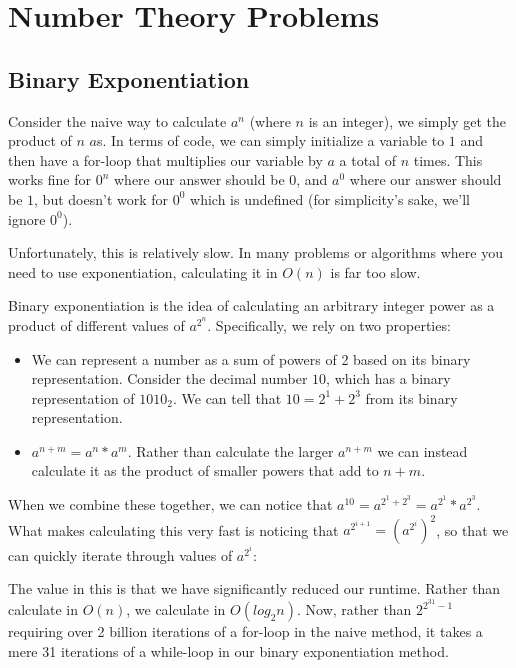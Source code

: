 \section{Number Theory Problems}

\subsection{Binary Exponentiation}

Consider the naive way to calculate $a^n$ (where $n$ is an integer), we simply get the product of $n$ $a$s. In terms of code, we can simply initialize a variable to $1$ and then have a for-loop that multiplies our variable by $a$ a total of $n$ times. This works fine for $0^n$ where our answer should be 0, and $a^0$ where our answer should be $1$, but doesn't work for $0^0$ which is undefined (for simplicity's sake, we'll ignore $0^0$).


Unfortunately, this is relatively slow. In many problems or algorithms where you need to use exponentiation, calculating it in $O(n)$ is far too slow.

Binary exponentiation is the idea of calculating an arbitrary integer power as a product of different values of $a^{2^n}$. Specifically, we rely on two properties:
\begin{itemize}
\item We can represent a number as a sum of powers of 2 based on its binary representation. Consider the decimal number $10$, which has a binary representation of $1010_2$. We can tell that $10 = 2^1 + 2^3$ from its binary representation.
\item $a^{n+m} = a^n * a^m$. Rather than calculate the larger $a^{n+m}$ we can instead calculate it as the product of smaller powers that add to $n+m$.
\end{itemize}

When we combine these together, we can notice that $a^{10} = a^{2^1 + 2^3} = a^{2^1} * a^{2^3}$. What makes calculating this very fast is noticing that $a^{2^{i+1}} = (a^{2^i})^2$, so that we can quickly iterate through values of $a^{2^i}$:


The value in this is that we have significantly reduced our runtime. Rather than calculate in $O(n)$, we calculate in $O(log_2n)$. Now, rather than $2^{2^{31}-1}$ requiring over 2 billion iterations of a for-loop in the naive method, it takes a mere 31 iterations of a while-loop in our binary exponentiation method.

